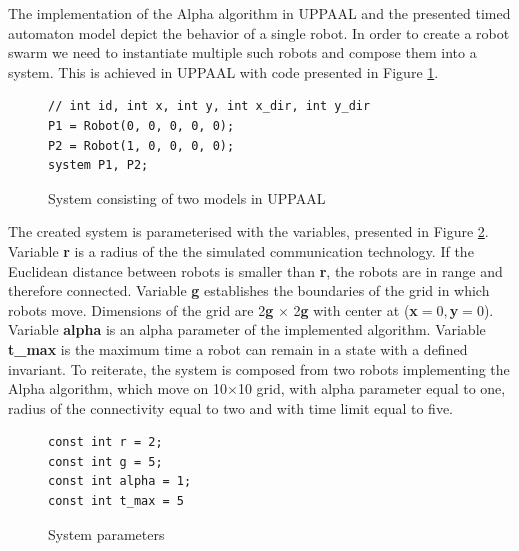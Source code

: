 The implementation of the Alpha algorithm in UPPAAL and the presented timed automaton model depict the behavior of a single robot. In order to create a robot swarm we need to instantiate multiple such robots and compose them into a system. This is achieved in UPPAAL with code presented in Figure \ref{fig:composition}.
\begin{figure}[H]
\caption{System consisting of two models in UPPAAL}
\lstset { language=C++ }
\begin{lstlisting}
// int id, int x, int y, int x_dir, int y_dir
P1 = Robot(0, 0, 0, 0, 0);
P2 = Robot(1, 0, 0, 0, 0);
system P1, P2;
\end{lstlisting}
\label{fig:composition}
\end{figure}

\noindent
The created system is parameterised with the variables, presented in Figure \ref{fig:parameters}. Variable \textbf{r} is a radius of the the simulated communication technology. If the Euclidean distance between robots is smaller than \textbf{r}, the robots are in range and therefore connected. Variable \textbf{g} establishes the boundaries of the grid in which robots move. Dimensions of the grid are 2\textbf{g} $\times$ 2\textbf{g} with center at (\textbf{x}$=0, $\textbf{y}$=0$). Variable \textbf{alpha} is an alpha parameter of the implemented algorithm. Variable \textbf{t\_max} is the maximum time a robot can remain in a state with a defined invariant. To reiterate, the system is composed from two robots implementing the Alpha algorithm, which move on 10$\times$10 grid, with alpha parameter equal to one, radius of the connectivity equal to two and with time limit equal to five.

\begin{figure}[H]
\caption{System parameters}
\lstset { language=C++ }
\begin{lstlisting}
const int r = 2;
const int g = 5;
const int alpha = 1;
const int t_max = 5
\end{lstlisting}
\label{fig:parameters}
\end{figure}

